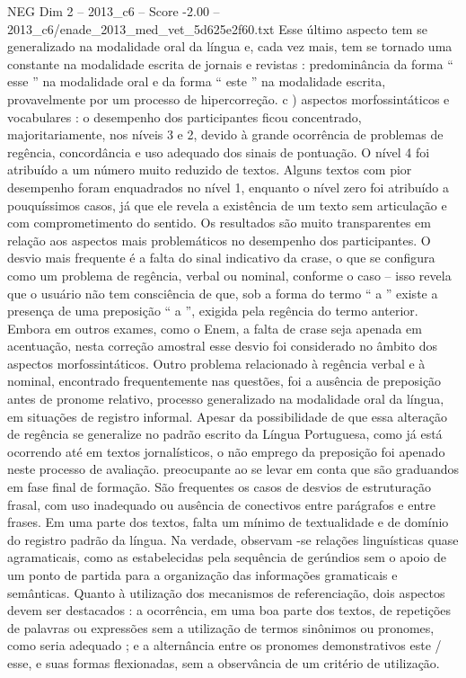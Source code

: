 \begin{textsample}{NEG Dim 2 – 2013\_c6 – Score -2.00 – 2013\_c6/enade\_2013\_med\_vet\_5d625e2f60.txt}
Esse último aspecto tem se generalizado na modalidade oral da língua e, cada vez mais, tem se tornado uma constante na modalidade escrita de jornais e revistas : predominância da forma “ esse ” na modalidade oral e da forma “ este ” na modalidade escrita, provavelmente por um processo de hipercorreção. c ) aspectos morfossintáticos e vocabulares : o desempenho dos participantes ficou concentrado, majoritariamente, nos níveis 3 e 2, devido à grande ocorrência de problemas de regência, concordância e uso adequado dos sinais de pontuação.
O nível 4 foi atribuído a um número muito reduzido de textos.
Alguns textos com pior desempenho foram enquadrados no nível 1, enquanto o nível zero foi atribuído a pouquíssimos casos, já que ele revela a existência de um texto sem articulação e com comprometimento do sentido.
Os resultados são muito transparentes em relação aos aspectos mais problemáticos no desempenho dos participantes.
O desvio mais frequente é a falta do sinal indicativo da crase, o que se configura como um problema de regência, verbal ou nominal, conforme o caso – isso revela que o usuário não tem consciência de que, sob a forma do termo “ a ” existe a presença de uma preposição “ a ”, exigida pela regência do termo anterior.
Embora em outros exames, como o Enem, a falta de crase seja apenada em acentuação, nesta correção amostral esse desvio foi considerado no âmbito dos aspectos morfossintáticos.
Outro problema relacionado à regência verbal e à nominal, encontrado frequentemente nas questões, foi a ausência de preposição antes de pronome relativo, processo generalizado na modalidade oral da língua, em situações de registro informal.
Apesar da possibilidade de que essa alteração de regência se generalize no padrão escrito da Língua Portuguesa, como já está ocorrendo até em textos jornalísticos, o não emprego da preposição foi apenado neste processo de avaliação. preocupante ao se levar em conta que são graduandos em fase final de formação.
São frequentes os casos de desvios de estruturação frasal, com uso inadequado ou ausência de conectivos entre parágrafos e entre frases.
Em uma parte dos textos, falta um mínimo de textualidade e de domínio do registro padrão da língua.
Na verdade, observam -se relações linguísticas quase agramaticais, como as estabelecidas pela sequência de gerúndios sem o apoio de um ponto de partida para a organização das informações gramaticais e semânticas.
Quanto à utilização dos mecanismos de referenciação, dois aspectos devem ser destacados : a ocorrência, em uma boa parte dos textos, de repetições de palavras ou expressões sem a utilização de termos sinônimos ou pronomes, como seria adequado ; e a alternância entre os pronomes demonstrativos este / esse, e suas formas flexionadas, sem a observância de um critério de utilização.

\end{textsample}
